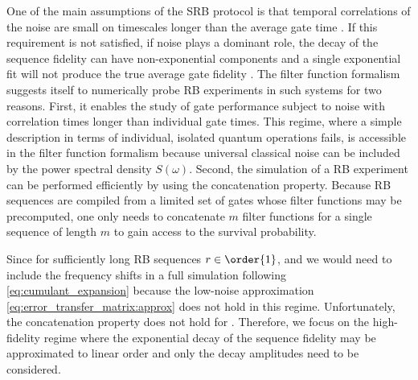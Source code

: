 One of the main assumptions of the SRB protocol is that temporal correlations of the noise are small on timescales longer than the average gate time \cite{Magesan2011}. If this requirement is not satisfied, \eg if \oneoverf noise plays a dominant role, the decay of the sequence fidelity can have non-exponential components \cite{Epstein2014,Fogarty2015,Feng2016} and a single exponential fit will not produce the true average gate fidelity \cite{Mavadia2018,Edmunds2020}. The filter function formalism suggests itself to numerically probe RB experiments in such systems for two reasons. First, it enables the study of gate performance subject to noise with correlation times longer than individual gate times. This regime, where a simple description in terms of individual, isolated quantum operations fails, is accessible in the filter function formalism because universal classical noise can be included by the power spectral density $S(\omega)$. Second, the simulation of a RB experiment can be performed efficiently by using the concatenation property. Because RB sequences are compiled from a limited set of gates whose filter functions may be precomputed, one only needs to concatenate $m$ filter functions for a single sequence of length $m$ to gain access to the survival probability.

Since for sufficiently long RB sequences $r\in\order{1}$, and we would need to include the frequency shifts \freqshifts in a full simulation following \cref{eq:cumulant_expansion} because the low-noise approximation \cref{eq:error_transfer_matrix:approx} does not hold in this regime. Unfortunately, the concatenation property does not hold for \freqshifts. Therefore, we focus on the high-fidelity regime where the exponential decay of the sequence fidelity may be approximated to linear order and only the decay amplitudes \decayamps need to be considered.

